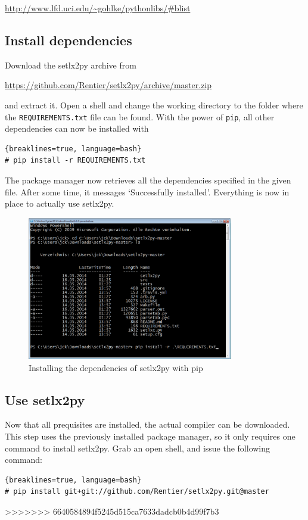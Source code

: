 \url{http://www.lfd.uci.edu/~gohlke/pythonlibs/#blist}

\subsection{Install dependencies}

Download the setlx2py archive from 

\url{https://github.com/Rentier/setlx2py/archive/master.zip}

and extract it. Open a shell and change the working directory to the folder where the \texttt{REQUIREMENTS.txt} file can be found. With the power of \texttt{pip}, all other dependencies can now be installed with 

\begin{lstlisting}{breaklines=true, language=bash}
# pip install -r REQUIREMENTS.txt
\end{lstlisting}

The package manager now retrieves all the dependencies specified in the given file. After some time, it messages `Successfully installed'. Everything is now in place to actually use setlx2py.

\begin{figure}[ht]
    \centering
    \includegraphics[width=0.8\textwidth]{img/install-reqs.png}
    \caption{Installing the dependencies of setlx2py with pip}
    \label{fig:install-req}
\end{figure}

\subsection{Use setlx2py}

Now that all prequisites are installed, the actual compiler can be downloaded. This step uses the previously installed package manager, so it only requires one command to install setlx2py. Grab an open shell, and issue the following command:

\begin{lstlisting}{breaklines=true, language=bash}
# pip install git+git://github.com/Rentier/setlx2py.git@master
\end{lstlisting}
>>>>>>> 6640584894f5245d515ca7633dadcb0b4d99f7b3
